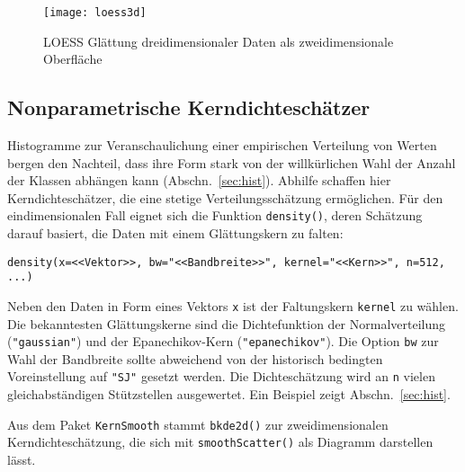 \begin{figure}[ht]
\centering
\texttt{[image: loess3d]}
\vspace*{-1.5em}
\caption{LOESS Glättung dreidimensionaler Daten als zweidimensionale Oberfläche}
\label{fig:loess3d}
\end{figure}

\subsection{Nonparametrische Kerndichteschätzer}
\label{sec:density}

Histogramme zur Veranschaulichung einer empirischen Verteilung von Werten bergen den Nachteil, dass ihre Form stark von der willkürlichen Wahl der Anzahl der Klassen abhängen kann (Abschn.\ \ref{sec:hist}). Abhilfe schaffen hier Kerndichteschätzer, die eine stetige Verteilungsschätzung ermöglichen. Für den eindimensionalen Fall eignet sich die Funktion \lstinline!density()!, deren Schätzung darauf basiert, die Daten mit einem Glättungskern zu falten:
\begin{lstlisting}
density(x=<<Vektor>>, bw="<<Bandbreite>>", kernel="<<Kern>>", n=512, ...)
\end{lstlisting}

Neben den Daten in Form eines Vektors \lstinline!x! ist der Faltungskern \lstinline!kernel! zu wählen. Die bekanntesten Glättungskerne sind die Dichtefunktion der Normalverteilung (\lstinline!"gaussian"!) und der Epanechikov-Kern (\lstinline!"epanechikov"!). Die Option \lstinline!bw! zur Wahl der Bandbreite sollte abweichend von der historisch bedingten Voreinstellung auf \lstinline!"SJ"! gesetzt werden. Die Dichteschätzung wird an \lstinline!n! vielen gleichabständigen Stützstellen ausgewertet. Ein Beispiel zeigt Abschn.\ \ref{sec:hist}.

Aus dem Paket \lstinline!KernSmooth! stammt \lstinline!bkde2d()! zur zweidimensionalen Kerndichteschätzung, die sich mit \lstinline!smoothScatter()! als Diagramm darstellen lässt.

